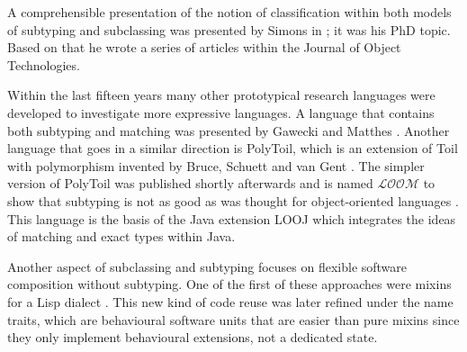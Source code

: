 A comprehensible presentation of the notion of classification within
both models of subtyping and subclassing was presented by Simons in
\cite{simons_theory_2002-2}; it was his PhD topic. Based on that he wrote a series of
articles within the Journal of Object Technologies.

Within the last fifteen years many other prototypical research
languages were developed to investigate more expressive languages. A
language that contains both subtyping and matching was presented
by Gawecki and Matthes \cite{gawecki_tool:_1995}. Another language
that goes in a similar direction is PolyToil, which is an extension
of Toil with polymorphism invented by Bruce, Schuett and van Gent
\cite{bruce_polytoil:_1995}. The simpler version of PolyToil was
published shortly afterwards and is named $\mathcal{LOOM}$ to show
that subtyping is not as good as was thought for object-oriented languages
\cite{bruce_subtyping_1997}. This language is the basis of the Java
extension LOOJ which integrates the ideas of matching and exact types
within Java.

Another aspect of subclassing and subtyping focuses
on flexible software composition without subtyping. One
of the first of these approaches were mixins for a Lisp dialect
\cite{bracha_mixin-based_1990}. This new kind of code reuse
was later refined under the name traits, which are behavioural software
units \cite{schaerli_traits:_2003,ducasse_traits:_2006} that are easier
than pure mixins since they only implement behavioural extensions,
not a dedicated state.

